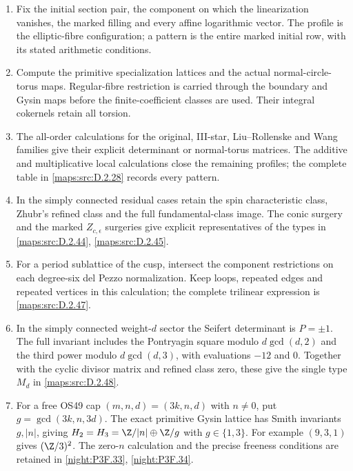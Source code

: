 \begin{enumerate}[label=\arabic*.,leftmargin=*]
\item Fix the initial section pair, the component on which the
linearization vanishes, the marked filling and every affine
logarithmic vector.  The profile is the elliptic-fibre configuration;
a pattern is the entire marked initial row, with its stated
arithmetic conditions.
\item Compute the primitive specialization lattices and the actual
normal-circle-torus maps.  Regular-fibre restriction is carried
through the boundary and Gysin maps before the finite-coefficient
classes are used.  Their integral cokernels retain all torsion.
\item The all-order calculations for the original, III-star,
Liu--Rollenske and Wang families give their explicit determinant
or normal-torus matrices.  The additive and multiplicative local
calculations close the remaining profiles; the complete table in
\cref{maps:src:D.2.28} records every pattern.
\item In the simply connected residual cases retain the spin
characteristic class, Zhubr's refined class and the full
fundamental-class image.  The conic surgery and the marked
$Z_{c,\epsilon}$ surgeries give explicit representatives of the
types in \cref{maps:src:D.2.44}, \cref{maps:src:D.2.45}.
\item For a period sublattice of the cusp, intersect the component
restrictions on each degree-six del Pezzo normalization.  Keep
loops, repeated edges and repeated vertices in this calculation;
the complete trilinear expression is
\cref{maps:src:D.2.47}.
\item In the simply connected weight-$d$ sector the Seifert
determinant is $P=\pm1$.  The full invariant includes the
Pontryagin square modulo $d\gcd(d,2)$ and the third power
modulo $d\gcd(d,3)$, with evaluations $-12$ and $0$.
Together with the cyclic divisor matrix and refined class zero,
these give the single type $M_d$ in \cref{maps:src:D.2.48}.
\item For a free OS49 cap $(m,n,d)=(3k,n,d)$ with $n\ne0$,
put $g=\gcd(3k,n,3d)$.  The exact primitive Gysin lattice has
Smith invariants $g,|n|$, giving
$H_2=H_3=\Z/|n|\oplus\Z/g$ with $g\in\{1,3\}$.
For example $(9,3,1)$ gives $(\Z/3)^2$.
The zero-$n$ calculation and the precise freeness conditions are
retained in \cref{night:P3F.33}, \cref{night:P3F.34}.
\end{enumerate}


